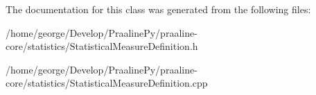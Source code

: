 The documentation for this class was generated from the following files\+:\begin{DoxyCompactItemize}
\item 
/home/george/\+Develop/\+Praaline\+Py/praaline-\/core/statistics/Statistical\+Measure\+Definition.\+h\item 
/home/george/\+Develop/\+Praaline\+Py/praaline-\/core/statistics/Statistical\+Measure\+Definition.\+cpp\end{DoxyCompactItemize}
